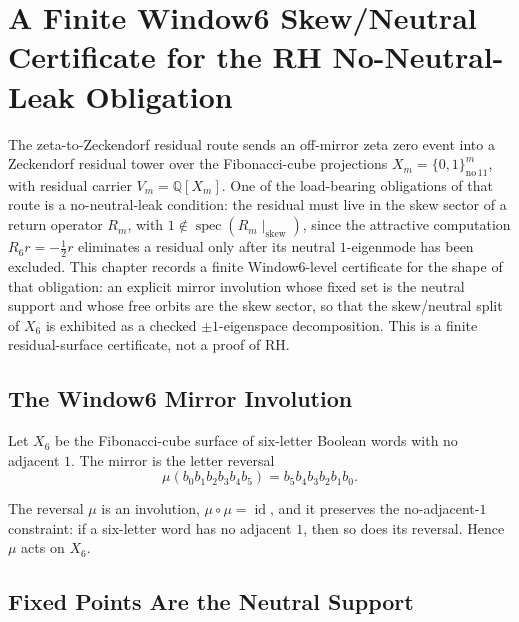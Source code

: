 \chapter{A Finite Window6 Skew/Neutral Certificate for the RH No-Neutral-Leak Obligation}
\label{ch:concrete-instances-window6-rh-no-neutral-leak-certificate}

The zeta-to-Zeckendorf residual route sends an off-mirror zeta zero event into a Zeckendorf residual tower over the Fibonacci-cube projections $X_m=\{0,1\}^m_{\mathrm{no}\,11}$, with residual carrier $V_m=\mathbb{Q}[X_m]$. One of the load-bearing obligations of that route is a no-neutral-leak condition: the residual must live in the skew sector of a return operator $R_m$, with $1\notin\operatorname{spec}(R_m\!\mid_{\text{skew}})$, since the attractive computation $R_6r=-\tfrac12 r$ eliminates a residual only after its neutral $1$-eigenmode has been excluded. This chapter records a finite Window6-level certificate for the shape of that obligation: an explicit mirror involution whose fixed set is the neutral support and whose free orbits are the skew sector, so that the skew/neutral split of $X_6$ is exhibited as a checked $\pm1$-eigenspace decomposition. This is a finite residual-surface certificate, not a proof of RH.

\section{The Window6 Mirror Involution}
\label{sec:window6-mirror-involution}

Let $X_6$ be the Fibonacci-cube surface of six-letter Boolean words with no adjacent $1$. The mirror is the letter reversal
$$
\mu(b_0b_1b_2b_3b_4b_5)=b_5b_4b_3b_2b_1b_0 .
$$

\begin{theorem}
\label{thm:window6-mirror-involution}
The reversal $\mu$ is an involution, $\mu\circ\mu=\operatorname{id}$, and it preserves the no-adjacent-$1$ constraint: if a six-letter word has no adjacent $1$, then so does its reversal. Hence $\mu$ acts on $X_6$.
\end{theorem}

\section{Fixed Points Are the Neutral Support}
\label{sec:window6-mirror-fixed-neutral}

